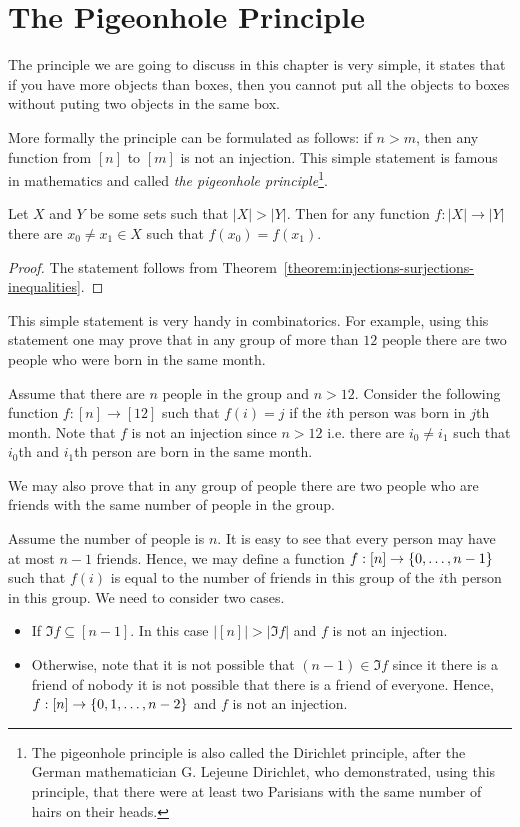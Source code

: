 \chapter{The Pigeonhole Principle}

The principle we are going to discuss in this chapter is very simple, it states
that if you have more objects than boxes, then you cannot put all the objects to
boxes without puting two objects in the same box.

More formally the principle can be formulated as follows: if $n > m$, then any
function from $[n]$ to $[m]$ is not an injection. This simple statement is
famous in mathematics and called \emph{the pigeonhole principle}\footnote{%
  The pigeonhole principle is also called the Dirichlet principle, after the
  German mathematician G. Lejeune Dirichlet, who demonstrated, using this
  principle, that there were at least two Parisians with the same number of
  hairs on their heads.
}.

\begin{theorem}
  Let $X$ and $Y$ be some sets such that $|X| > |Y|$. Then for any function
  $f : |X| \to |Y|$ there are $x_0 \neq x_1 \in X$ such that $f(x_0) = f(x_1)$.
\end{theorem}
\begin{proof}
  The statement follows from
  Theorem~\ref{theorem:injections-surjections-inequalities}.
\end{proof}

This simple statement is very handy in combinatorics. For example, using this
statement one may prove that in any group of more than $12$ people there are
two people who were born in the same month.

Assume that there are $n$ people in the group and $n > 12$.
Consider the following function $f : [n] \to [12]$ such that $f(i) = j$ if the
$i$th person was born in $j$th month. Note that $f$ is not an injection since
$n > 12$ i.e. there are $i_0 \neq i_1$ such that $i_0$th and $i_1$th person are
born in the same month.

We may also prove that in any group of people there are two people who are
friends with the same number of people in the group.

Assume the number of people is $n$. It is easy to see that every person may
have at most $n - 1$ friends. Hence, we may define a function $f: [n] \to
\set{0, \dots, n - 1}$ such that $f(i)$ is equal to the number of friends in
this group of the $i$th person in this group.
We need to consider two cases.
\begin{itemize}
  \item If $\Im f \subseteq [n - 1]$. In this case
    $|[n]| > |\Im f|$ and $f$ is not an injection.
  \item Otherwise, note that it is not possible that $(n - 1) \in \Im f$
    since it there is a friend of nobody it is not possible that there is a
    friend of everyone. Hence, $f : [n] \to \set{0, 1, \dots, n - 2}$ and $f$ is
    not an injection.
\end{itemize}

